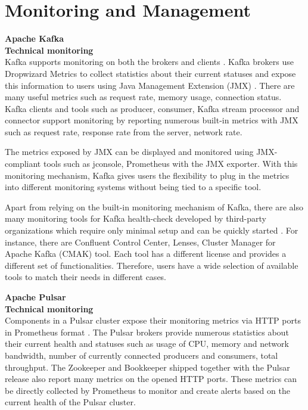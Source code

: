 \section{Monitoring and Management}
\large \textbf{Apache Kafka}\\
\normalsize
\textbf{Technical monitoring}\\
Kafka supports monitoring on both the brokers and clients \cite{kafkamonitoring}. Kafka brokers use Dropwizard Metrics \cite{kafkamonitoringmetrics} to collect statistics about their current statuses and expose this information to users using Java Management Extension (JMX) \cite{java2006monitoring}. There are many useful metrics such as request rate, memory usage, connection status. Kafka clients and tools such as producer, consumer, Kafka stream processor and connector support monitoring by reporting numerous built-in metrics with JMX such as request rate, response rate from the server, network rate. 

The metrics exposed by JMX can be displayed and monitored using JMX-compliant tools such as jconsole, Prometheus with the JMX exporter. With this monitoring mechanism, Kafka gives users the flexibility to plug in the metrics into different monitoring systems without being tied to a specific tool. 

Apart from relying on the built-in monitoring mechanism of Kafka, there are also many monitoring tools for Kafka health-check developed by third-party organizations which require only minimal setup and can be quickly started \cite{kafkamonitoringtools1} \cite{kafkamonitoringtools2}. For instance, there are Confluent Control Center, Lenses, Cluster Manager for Apache Kafka (CMAK) tool. Each tool has a different license and provides a different set of functionalities. Therefore, users have a wide selection of available tools to match their needs in different cases.

\large \textbf{Apache Pulsar}\\
\normalsize
\textbf{Technical monitoring}\\
Components in a Pulsar cluster expose their monitoring metrics via HTTP ports in Prometheus format \cite{pulsarmetrics}. The Pulsar brokers provide numerous statistics about their current health and statuses such as usage of CPU, memory and network bandwidth, number of currently connected producers and consumers, total throughput. The Zookeeper and Bookkeeper shipped together with the Pulsar release also report many metrics on the opened HTTP ports.
These metrics can be directly collected by Prometheus to monitor and create alerts based on the current health of the Pulsar cluster. 

